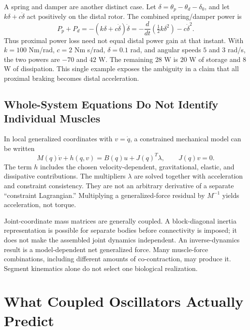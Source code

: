 A spring and damper are another distinct case. Let $\delta=\theta_p-\theta_d-\delta_0$, and let $k\delta+c\dot\delta$ act positively on the distal rotor. The combined spring/damper power is
\begin{equation}
P_{p}+P_{d}=-(k\delta+c\dot\delta)\dot\delta
=-\frac{d}{dt}\left(\tfrac12k\delta^2\right)-c\dot\delta^2.
\end{equation}
Thus proximal power loss need not equal distal power gain at that instant. With $k=100$ Nm/rad, $c=2$ Nm s/rad, $\delta=0.1$ rad, and angular speeds $5$ and $3$ rad/s, the two powers are $-70$ and $42$ W. The remaining $28$ W is $20$ W of storage and $8$ W of dissipation. This single example exposes the ambiguity in a claim that all proximal braking becomes distal acceleration.

\subsection{Whole-System Equations Do Not Identify Individual Muscles}
In local generalized coordinates with $v=\dot q$, a constrained mechanical model can be written
\begin{equation}
M(q)\dot v+h(q,v)=B(q)u+J(q)^T\lambda,\qquad J(q)v=0.
\end{equation}
The term $h$ includes the chosen velocity-dependent, gravitational, elastic, and dissipative contributions. The multipliers $\lambda$ are solved together with acceleration and constraint consistency. They are not an arbitrary derivative of a separate ``constraint Lagrangian.'' Multiplying a generalized-force residual by $M^{-1}$ yields acceleration, not torque.

Joint-coordinate mass matrices are generally coupled. A block-diagonal inertia representation is possible for separate bodies before connectivity is imposed; it does not make the assembled joint dynamics independent. An inverse-dynamics result is a model-dependent net generalized force. Many muscle-force combinations, including different amounts of co-contraction, may produce it. Segment kinematics alone do not select one biological realization.

\section{What Coupled Oscillators Actually Predict}
